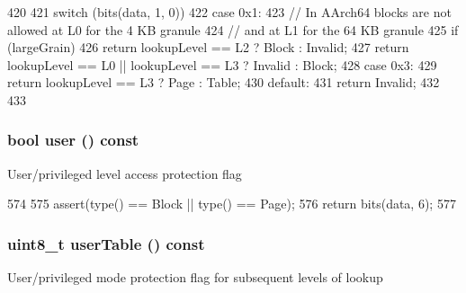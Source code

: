 \begin{DoxyCode}
420         {
421             switch (bits(data, 1, 0)) {
422               case 0x1:
423                 // In AArch64 blocks are not allowed at L0 for the 4 KB granule
424                 // and at L1 for the 64 KB granule
425                 if (largeGrain)
426                     return lookupLevel == L2 ? Block : Invalid;
427                 return lookupLevel == L0 || lookupLevel == L3 ? Invalid : Block;
428               case 0x3:
429                 return lookupLevel == L3 ? Page : Table;
430               default:
431                 return Invalid;
432             }
433         }
\end{DoxyCode}
\hypertarget{classArmISA_1_1TableWalker_1_1LongDescriptor_a9616ae36375179bd5d3eef61584021fe}{
\subsubsection[{user}]{\setlength{\rightskip}{0pt plus 5cm}bool user () const}}
\label{classArmISA_1_1TableWalker_1_1LongDescriptor_a9616ae36375179bd5d3eef61584021fe}
User/privileged level access protection flag 


\begin{DoxyCode}
574         {
575             assert(type() == Block || type() == Page);
576             return bits(data, 6);
577         }
\end{DoxyCode}
\hypertarget{classArmISA_1_1TableWalker_1_1LongDescriptor_a8d695176b203e8d330ab60017cfb8e24}{
\subsubsection[{userTable}]{\setlength{\rightskip}{0pt plus 5cm}uint8\_\-t userTable () const}}
\label{classArmISA_1_1TableWalker_1_1LongDescriptor_a8d695176b203e8d330ab60017cfb8e24}
User/privileged mode protection flag for subsequent levels of lookup 


